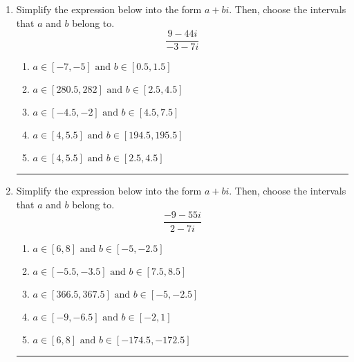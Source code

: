\documentclass[14pt]{extbook}
\newcommand{\litem}[1]{\item#1\hspace*{-1cm}\rule{\textwidth}{0.4pt}}
\begin{document}
\begin{enumerate}
{\begin{enumerate}[label=\Alph*.]
\end{enumerate} }
\litem{
Simplify the expression below into the form $a+bi$. Then, choose the intervals that $a$ and $b$ belong to.\[ \frac{9 - 44 i}{-3 - 7 i} \]\begin{enumerate}[label=\Alph*.]
\item \( a \in [-7, -5] \text{ and } b \in [0.5, 1.5] \)
\item \( a \in [280.5, 282] \text{ and } b \in [2.5, 4.5] \)
\item \( a \in [-4.5, -2] \text{ and } b \in [4.5, 7.5] \)
\item \( a \in [4, 5.5] \text{ and } b \in [194.5, 195.5] \)
\item \( a \in [4, 5.5] \text{ and } b \in [2.5, 4.5] \)

\end{enumerate} }
\litem{
Simplify the expression below into the form $a+bi$. Then, choose the intervals that $a$ and $b$ belong to.\[ \frac{-9 - 55 i}{2 - 7 i} \]\begin{enumerate}[label=\Alph*.]
\item \( a \in [6, 8] \text{ and } b \in [-5, -2.5] \)
\item \( a \in [-5.5, -3.5] \text{ and } b \in [7.5, 8.5] \)
\item \( a \in [366.5, 367.5] \text{ and } b \in [-5, -2.5] \)
\item \( a \in [-9, -6.5] \text{ and } b \in [-2, 1] \)
\item \( a \in [6, 8] \text{ and } b \in [-174.5, -172.5] \)

\end{enumerate} }
\end{enumerate}
\end{document}
